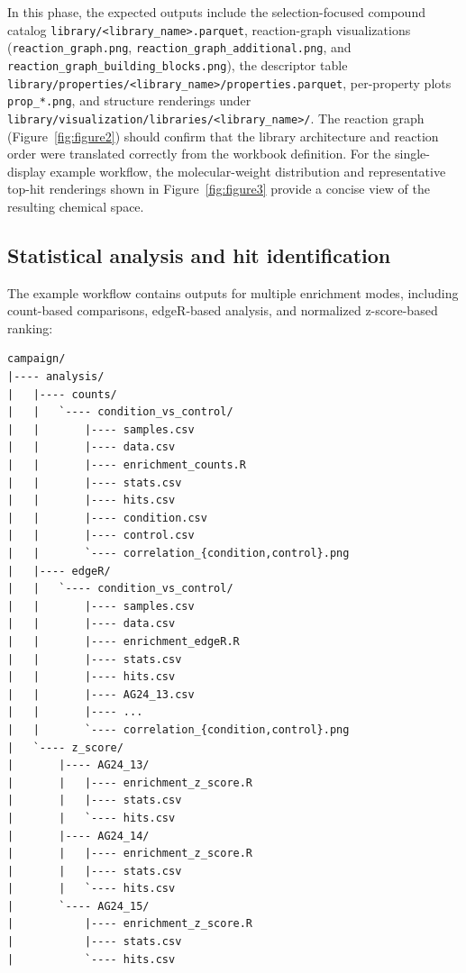 In this phase, the expected outputs include the selection-focused compound catalog \texttt{library/<library\_name>.parquet}, reaction-graph visualizations (\texttt{reaction\_graph.png}, \texttt{reaction\_graph\_additional.png}, and \texttt{reaction\_graph\_building\_blocks.png}), the descriptor table \texttt{library/properties/<library\_name>/properties.parquet}, per-property plots \texttt{prop\_*.png}, and structure renderings under \texttt{library/visualization/libraries/<library\_name>/}. The reaction graph (Figure~\ref{fig:figure2}) should confirm that the library architecture and reaction order were translated correctly from the workbook definition. For the single-display example workflow, the molecular-weight distribution and representative top-hit renderings shown in Figure~\ref{fig:figure3} provide a concise view of the resulting chemical space.

\subsection{Statistical analysis and hit identification}
The example workflow contains outputs for multiple enrichment modes, including count-based comparisons, edgeR-based analysis, and normalized z-score-based ranking:

\begin{lstlisting}
campaign/
|---- analysis/
|   |---- counts/
|   |   `---- condition_vs_control/
|   |       |---- samples.csv
|   |       |---- data.csv
|   |       |---- enrichment_counts.R
|   |       |---- stats.csv
|   |       |---- hits.csv
|   |       |---- condition.csv
|   |       |---- control.csv
|   |       `---- correlation_{condition,control}.png
|   |---- edgeR/
|   |   `---- condition_vs_control/
|   |       |---- samples.csv
|   |       |---- data.csv
|   |       |---- enrichment_edgeR.R
|   |       |---- stats.csv
|   |       |---- hits.csv
|   |       |---- AG24_13.csv
|   |       |---- ...
|   |       `---- correlation_{condition,control}.png
|   `---- z_score/
|       |---- AG24_13/
|       |   |---- enrichment_z_score.R
|       |   |---- stats.csv
|       |   `---- hits.csv
|       |---- AG24_14/
|       |   |---- enrichment_z_score.R
|       |   |---- stats.csv
|       |   `---- hits.csv
|       `---- AG24_15/
|           |---- enrichment_z_score.R
|           |---- stats.csv
|           `---- hits.csv
\end{lstlisting}

